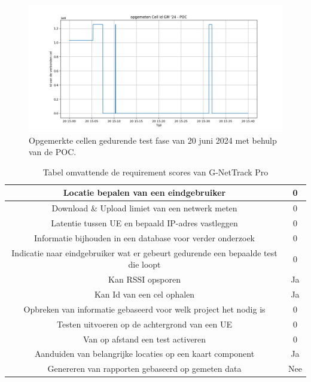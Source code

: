 \begin{figure}
    \includegraphics[width=1.2\linewidth]{graphics/CellId_graph_40min_POC}
    \caption[Opgemerkte cellen gedurende test fase van 20 juni 2024 met behulp van de POC.]{Opgemerkte cellen gedurende test fase van 20 juni 2024 met behulp van de POC.}
    \label{fig:CI_POC}
\end{figure}

\begin{table}
    \begin{tabular}{| c | c |}
        \hline
        Locatie bepalen van een eindgebruiker & 0 \\
        \hline
        Download \& Upload limiet van een netwerk meten & 0 \\
        \hline
        Latentie tussen UE en bepaald IP-adres vastleggen & 0 \\
        \hline
        Informatie bijhouden in een database voor verder onderzoek & 0 \\
        \hline
        Indicatie naar eindgebruiker wat er gebeurt gedurende een bepaalde test die loopt & 0 \\
        \hline
        Kan RSSI opsporen & Ja \\
        \hline
        Kan Id van een cel ophalen & Ja \\
        \hline
        Opbreken van informatie gebaseerd voor welk project het nodig is & 0 \\
        \hline
        Testen uitvoeren op de achtergrond van een UE & 0 \\
        \hline
        Van op afstand een test activeren & 0 \\
        \hline
        Aanduiden van belangrijke locaties op een kaart component & Ja \\
        \hline
        Genereren van rapporten gebaseerd op gemeten data & Nee \\
        \hline
    \end{tabular}
\caption{Tabel omvattende de requirement scores van G-NetTrack Pro}
\end{table}

